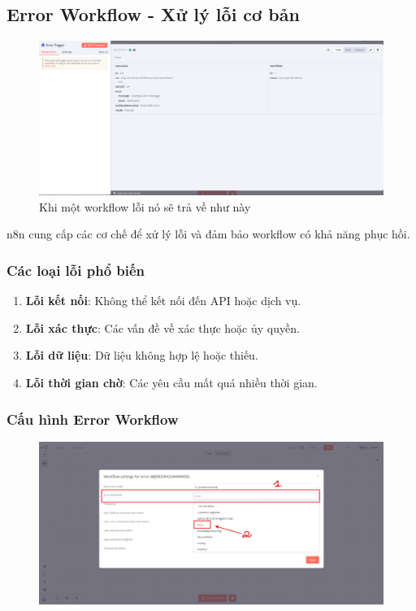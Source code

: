 \subsection{Error Workflow - Xử lý lỗi cơ bản}
\begin{figure}[htbp]
    \centering
    \includegraphics[width=1\linewidth]{Chap1-7/error_event.pdf}
    \caption{Khi một workflow lỗi nó sẽ trả về như này}
\end{figure}
n8n cung cấp các cơ chế để xử lý lỗi và đảm bảo workflow có khả năng phục hồi.

\subsubsection{Các loại lỗi phổ biến}

\begin{enumerate}
  \item \textbf{Lỗi kết nối}: Không thể kết nối đến API hoặc dịch vụ.
  \item \textbf{Lỗi xác thực}: Các vấn đề về xác thực hoặc ủy quyền.
  \item \textbf{Lỗi dữ liệu}: Dữ liệu không hợp lệ hoặc thiếu.
  \item \textbf{Lỗi thời gian chờ}: Các yêu cầu mất quá nhiều thời gian.
\end{enumerate}

\subsubsection{Cấu hình Error Workflow}
\begin{figure}[htbp]
    \centering
    \includegraphics[width=1\linewidth]{Chap1-7/setting_error.pdf}
\end{figure}

